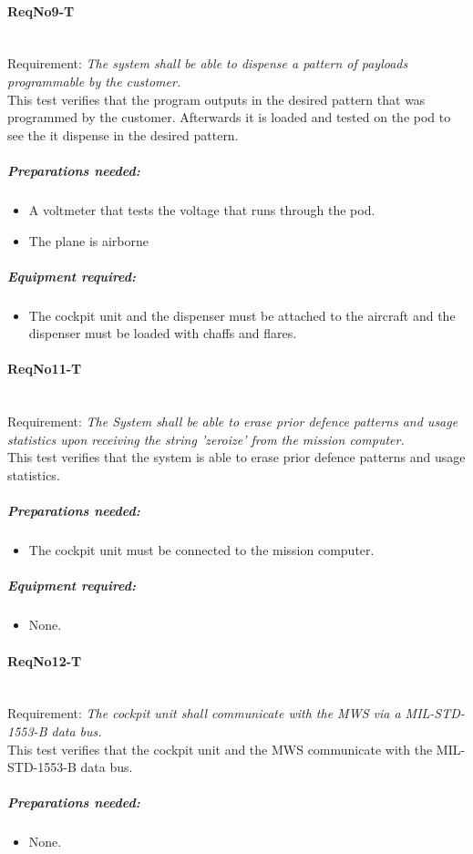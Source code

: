 \paragraph{ReqNo9-T}\mbox{}\\ %
Requirement: \textit{The system shall be able to dispense a pattern of payloads programmable by the customer.}
\\
This test verifies that the program outputs in the desired pattern that was programmed by the customer. Afterwards it is loaded and tested on the pod to see the it dispense in the desired pattern.
\\
	\subparagraph{Preparations needed:}
	\begin{itemize}
	\item A voltmeter that tests the voltage that runs through the pod.
	\item The plane is airborne
	\end{itemize}

	\subparagraph{Equipment required:}
	\begin{itemize}
	\item The cockpit unit and the dispenser must be attached to the aircraft and the dispenser must be loaded with chaffs and flares.
	\end{itemize}

\paragraph{ReqNo11-T}\mbox{}\\ %
Requirement: \textit{The System shall be able to erase prior defence patterns and usage statistics upon receiving the string 'zeroize' from the mission computer.}\\
This test verifies that the system is able to erase prior defence patterns and usage statistics.
	\subparagraph{Preparations needed:}
	\begin{itemize}
	\item The cockpit unit must be connected to the mission computer.
	\end{itemize}

	\subparagraph{Equipment required:}
	\begin{itemize}
	\item None.
	\end{itemize}

\paragraph{ReqNo12-T}\mbox{}\\ %
Requirement: \textit{The cockpit unit shall communicate with the MWS via a MIL-STD-1553-B data bus.}\\
This test verifies that the cockpit unit and the MWS communicate with the MIL-STD-1553-B data bus.
	\subparagraph{Preparations needed:}
	\begin{itemize}
	\item None.
	\end{itemize}	
	

